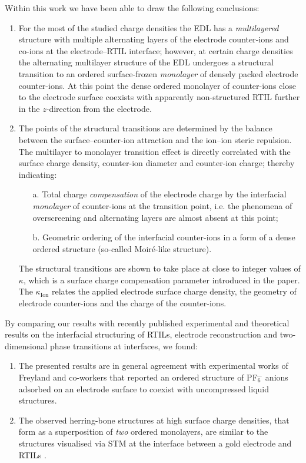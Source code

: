 \documentclass[final,5p,times,twocolumn]{elsarticle}
\begin{document}
Within this work we have been able to draw the following conclusions:
\begin{enumerate}
 \item  For the most of the studied charge densities the EDL has a \emph{multilayered} structure with multiple alternating layers of the electrode counter-ions and co-ions at the electrode--RTIL interface; however, at certain charge densities the alternating multilayer structure of the EDL undergoes a structural transition to an ordered surface-frozen \emph{monolayer} of densely packed electrode counter-ions. At this point the dense ordered monolayer of counter-ions close to the electrode surface coexists with apparently non-structured RTIL further in the $z$-direction from the electrode.
 \item The points of the structural transitions  are determined by the balance between the surface--counter-ion attraction and the ion--ion steric repulsion. The multilayer to monolayer transition effect is directly correlated with the surface charge density, counter-ion diameter and counter-ion charge; thereby indicating: 
 \begin{itemize}
  \item[a.] Total charge \emph{compensation} of the electrode charge by the interfacial \emph{monolayer} of counter-ions at the transition point, i.e. the phenomena of overscreening and alternating layers are almost absent at this point;
  \item[b.] Geometric ordering of the interfacial counter-ions in a form of a dense ordered structure (so-called Moir{\'e}-like structure).
 \end{itemize}
 The structural transitions are shown to take place at close to integer values of $\kappa$, which is a surface charge compensation parameter introduced in the paper. The $\kappa_{\mathrm{Ion}}$ relates the applied electrode surface charge density, the geometry of electrode counter-ions and the charge of the counter-ions.
\end{enumerate}

By comparing our results with recently published experimental and theoretical results on the interfacial structuring of RTILs, electrode reconstruction and two-dimensional phase transitions at interfaces, we found:

\begin{enumerate}
 \item The presented results are in general agreement with experimental works of Freyland and co-workers \cite{Pan2006,Freyland2008} that reported an ordered structure of PF$_6^-$ anions adsorbed on an electrode surface to coexist with uncompressed liquid structures.
 \item The observed herring-bone structures at high surface charge densities, that form as a superposition of \emph{two} ordered monolayers, are similar to the structures visualised via STM at the interface between a gold electrode and RTILs \cite{Aal2011,Druschler2012}. 
\end{enumerate}
\end{document}
